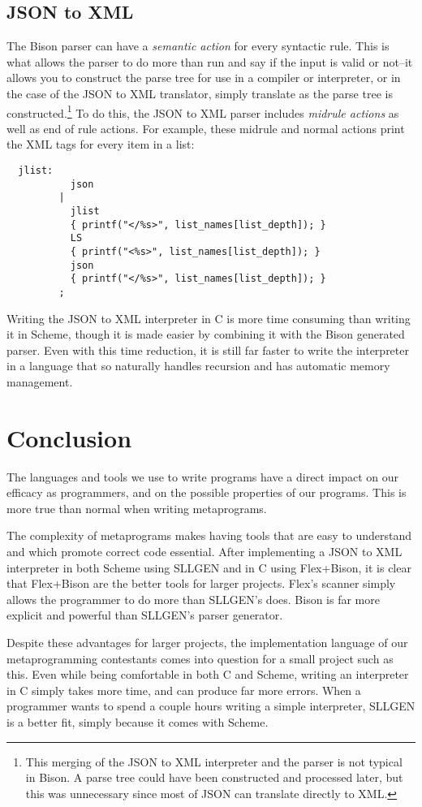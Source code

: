\documentclass[12pt]{article}
\begin{document}
\subsection{JSON to XML}
The Bison parser can have a \textit{semantic action} for every
syntactic rule.\cite[3.4.6]{bison}  This is what allows the
parser to do more than run and say if the input is valid or not--it
allows you to construct the parse tree for use in a compiler or
interpreter, or in the case of the JSON to XML translator, simply
translate as the parse tree is constructed.\footnote{This merging of
  the JSON to XML interpreter and the parser is not typical in Bison.
  A parse tree could have been constructed and processed later, but
  this was unnecessary since most of JSON can translate directly to
  XML.} To do this, the JSON to XML parser includes \textit{midrule
  actions}\cite[3.4.8]{bison} as well as end of rule
actions.  For example, these midrule and normal actions print the XML
tags for every item in a list:
\pagebreak
\begin{lstlisting}
  jlist:
           json
         |
           jlist
           { printf("</%s>", list_names[list_depth]); }
           LS
           { printf("<%s>", list_names[list_depth]); }
           json
           { printf("</%s>", list_names[list_depth]); }
         ;
\end{lstlisting}
Writing the JSON to XML interpreter in C is more time consuming than
writing it in Scheme, though it is made easier by combining it with
the Bison generated parser.  Even with this time reduction, it is
still far faster to write the interpreter in a language that so
naturally handles recursion and has automatic memory management.
\section{Conclusion}
The languages and tools we use to write programs have a direct impact
on our efficacy as programmers, and on the possible properties of our
programs.  This is more true than normal when writing
metaprograms.\par
The complexity of metaprograms makes having tools that are easy to
understand and which promote correct code essential.  After
implementing a JSON to XML interpreter in both Scheme using SLLGEN and
in C using Flex+Bison, it is clear that Flex+Bison are the better
tools for larger projects.  Flex's scanner simply allows the
programmer to do more than SLLGEN's does.  Bison is far more explicit
and powerful than SLLGEN's parser generator.\par
Despite these advantages for larger projects, the implementation
language of our metaprogramming contestants comes into question for a
small project such as this.  Even while being comfortable in both C
and Scheme, writing an interpreter in C simply takes more time, and
can produce far more errors.  When a programmer wants to spend a
couple hours writing a simple interpreter, SLLGEN is a better fit,
simply because it comes with Scheme.
\end{document}

